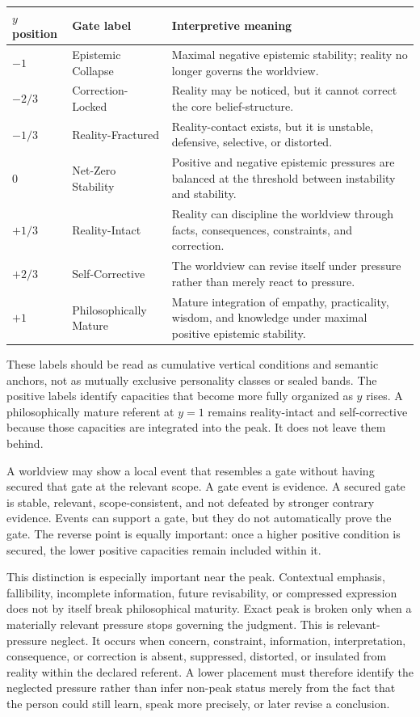 \documentclass[11pt]{article}
\begin{document}
\begin{center}
\begin{tabular}{>{\raggedright\arraybackslash}p{2.3cm} >{\raggedright\arraybackslash}p{4.3cm} >{\raggedright\arraybackslash}p{6.4cm}}
\toprule
$y$ position & Gate label & Interpretive meaning \\
\midrule
$-1$ & Epistemic Collapse & Maximal negative epistemic stability; reality no longer governs the worldview. \\
$-2/3$ & Correction-Locked & Reality may be noticed, but it cannot correct the core belief-structure. \\
$-1/3$ & Reality-Fractured & Reality-contact exists, but it is unstable, defensive, selective, or distorted. \\
$0$ & Net-Zero Stability & Positive and negative epistemic pressures are balanced at the threshold between instability and stability. \\
$+1/3$ & Reality-Intact & Reality can discipline the worldview through facts, consequences, constraints, and correction. \\
$+2/3$ & Self-Corrective & The worldview can revise itself under pressure rather than merely react to pressure. \\
$+1$ & Philosophically Mature & Mature integration of empathy, practicality, wisdom, and knowledge under maximal positive epistemic stability. \\
\bottomrule
\end{tabular}
\end{center}

These labels should be read as cumulative vertical conditions and semantic anchors, not as mutually exclusive personality classes or sealed bands. The positive labels identify capacities that become more fully organized as $y$ rises. A philosophically mature referent at $y=1$ remains reality-intact and self-corrective because those capacities are integrated into the peak. It does not leave them behind.

A worldview may show a local event that resembles a gate without having secured that gate at the relevant scope. A gate event is evidence. A secured gate is stable, relevant, scope-consistent, and not defeated by stronger contrary evidence. Events can support a gate, but they do not automatically prove the gate. The reverse point is equally important: once a higher positive condition is secured, the lower positive capacities remain included within it.

This distinction is especially important near the peak. Contextual emphasis, fallibility, incomplete information, future revisability, or compressed expression does not by itself break philosophical maturity. Exact peak is broken only when a materially relevant pressure stops governing the judgment. This is relevant-pressure neglect. It occurs when concern, constraint, information, interpretation, consequence, or correction is absent, suppressed, distorted, or insulated from reality within the declared referent. A lower placement must therefore identify the neglected pressure rather than infer non-peak status merely from the fact that the person could still learn, speak more precisely, or later revise a conclusion.
\end{document}
